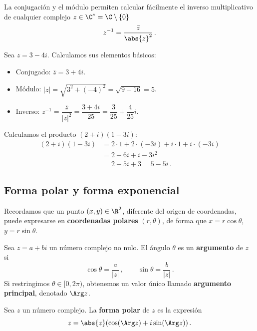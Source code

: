 La conjugación y el módulo permiten calcular fácilmente el inverso multiplicativo de cualquier complejo $z\in\C^\ast = \C\setminus\{0\}$
\begin{equation}
  \label{eq:inverso_complejo}
  z^{-1} = \frac{\bar z}{\abs{z}^2}\,.
\end{equation}

\begin{eje}
  Sea $z = 3 - 4i$. Calculamos sus elementos básicos:
  \begin{itemize}
    \item Conjugado: $\bar{z} = 3 + 4i$.
    \item Módulo: $|z| = \sqrt{3^2 + (-4)^2} = \sqrt{9+16} = 5$.
    \item Inverso: $z^{-1} = \dfrac{\bar{z}}{|z|^2} = \dfrac{3+4i}{25} = \dfrac{3}{25} + \dfrac{4}{25}i$.
  \end{itemize}
\end{eje}

\begin{eje}
  Calculamos el producto $(2+i)(1-3i)$:
  \begin{align*}
    (2+i)(1-3i) & = 2\cdot1 + 2\cdot(-3i) + i\cdot1 + i\cdot(-3i) \\
                & = 2 - 6i + i - 3i^2                             \\
                & = 2 - 5i + 3 = 5 - 5i\,.
  \end{align*}
\end{eje}

\subsection{Forma polar y forma exponencial}

Recordamos que un punto $(x,y)\in\R^2$, diferente del origen de coordenadas, puede expresarse en \textbf{coordenadas polares} $(r,\theta)$, de forma que $x = r\cos\theta$, $y = r\sin\theta$.

\begin{defi}[Argumento]
  \label{def:argumento}
  Sea $z=a+bi$ un número complejo no nulo. El ángulo $\theta$ es un \textbf{argumento} de $z$ si
  \[
    \cos\theta = \frac{a}{|z|}\,,\qquad \sin\theta = \frac{b}{|z|}\,.
  \]
  Si restringimos $\theta\in[0,2\pi)$, obtenemos un valor único llamado \textbf{argumento principal}, denotado $\Arg z$.
\end{defi}

\begin{defi}
  Sea $z$ un número complejo. La \textbf{forma polar} de $z$ es la expresión
  \[ z = \abs{z}(\cos(\Arg z) + i\sin(\Arg z))\,. \]
\end{defi}

